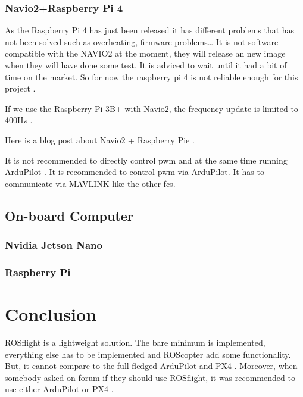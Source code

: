             \subsubsection{Navio2+Raspberry Pi 4}
                As the Raspberry Pi 4 has just been released it has different problems that has not been solved such as overheating, firmware problems… It is not software compatible with the NAVIO2 at the moment, they will release an new image when they will have done some test. It is adviced to wait until it had a bit of time on the market. So for now the raspberry pi 4 is not reliable enough for this project \cite{ardupilot_rpi_compatibility}.
        
            If we use the Raspberry Pi 3B+ with Navio2, the frequency update is limited to 400Hz \cite{emlid_pwm_frequency}.
            
            Here is a blog post about Navio2 + Raspberry Pie \cite{dojofordrones_rpi_drone}.
            
            It is not recommended to directly control pwm and at the same time running ArduPilot \cite{emlid_servo_control}. It is recommended to control pwm via ArduPilot. It has to communicate via MAVLINK like the other \glspl{fc}.
        
        \subsection{On-board Computer}
            \subsubsection{Nvidia Jetson Nano}
        
            \subsubsection{Raspberry Pi}
    
    \section{Conclusion}
        ROSflight is a lightweight solution. The bare minimum is implemented, everything else has to be implemented and ROScopter add some functionality. But, it cannot compare to the full-fledged ArduPilot and PX4 \cite{reddit_firmware_ros}. Moreover, when somebody asked on forum if they should use ROSflight, it was recommended to use either ArduPilot or PX4 \cite{reddit_swarm_ros}.
        
